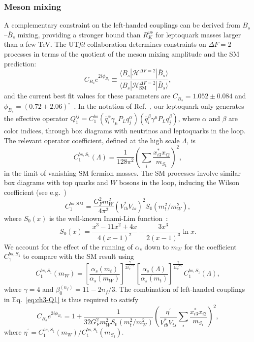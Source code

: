 \subsubsection{Meson mixing}

A complementary constraint on the left-handed couplings can be derived from
$B_s$--$\bar{B}_s$ mixing, providing a stronger bound than $R_K^{\nu\nu}$ for
leptoquark masses larger than a few TeV. The UT\textit{fit} collaboration
determines constraints on $\Delta F = 2$ processes in terms of the quotient of
the meson mixing amplitude and the SM prediction:
\begin{equation}
  C_{B_s} e^{2i \phi_{B_s}} \equiv \frac{\langle B_s | \mathscr{H}^{\Delta F = 2} | \bar{B}_s \rangle}{\langle B_s | \mathscr{H}^{\Delta F = 2}_{\text{SM}} | \bar{B}_s \rangle},
\end{equation}
and the current best fit values for these parameters are $C_{B_s} = 1.052 \pm
0.084$ and $\phi_{B_s} = (0.72 \pm 2.06)^\circ$~\cite{Bona:2007vi}. In the
notation of Ref.~\cite{Bona:2007vi}, our leptoquark only generates the effective
operator $Q^{ij}_1 = C^{bs}_1(\bar{q}^\alpha_i \gamma_\mu P_L
q_j^\alpha)(\bar{q}^\beta_i \gamma^\mu P_L q_j^\beta)$, where $\alpha$ and
$\beta$ are color indices, through box diagrams with neutrinos and leptoquarks
in the loop. The relevant operator coefficient, defined at the high scale
$\Lambda$, is
\begin{equation} \label{eq:ch3-Q1}
  C^{bs, S_{1}}_{1}(\Lambda) = \frac{1}{128 \pi^2} \left(\sum_i \frac{x_{i 3}^* x_{i 2}}{m_{S_{1}}}\right)^2,
\end{equation}
in the limit of vanishing SM fermion masses. The SM processes involve similar
box diagrams with top quarks and $W$ bosons in the loop, inducing the Wilson
coefficient (see e.g.~\cite{Fleischer:2008uj})
\begin{equation}
  C^{bs, \text{SM}}_{1} = \frac{G_F^2 m_W^2}{4\pi^2}(V_{tb}^*V_{ts})^2 S_0(m_t^2 / m_W^2),
\end{equation}
where $S_0(x)$ is the well-known Inami-Lim function~\cite{Inami:1980fz}:
\begin{equation}
  S_0(x) = \frac{x^3 -11x^2 + 4x}{4(x-1)^2} - \frac{3x^3}{2(x-1)^3} \ln x.
\end{equation}
We account for the effect of the running of $\alpha_s$ down to $m_W$ for the
coefficient $C^{bs, S_{1}}_{1}$ to compare with the SM result
using~\cite{Aebischer:2017gaw}
\begin{equation}
  C_1^{bs, S_{1}}(m_W) =  \left[\frac{\alpha_s(m_t)}{\alpha_s(m_W)}\right]^{\frac{\gamma}{2\beta_0^{(5)}}} \left[\frac{\alpha_s(\Lambda)}{\alpha_s(m_t)}\right]^{\frac{\gamma}{2\beta_0^{(6)}}} C_1^{bs, S_{1}}(\Lambda),
\end{equation}
where $\gamma = 4$ and $\beta_0^{(n_f)} = 11 - 2 n _f / 3$. The combination of
left-handed couplings in Eq.~\eqref{eq:ch3-Q1} is thus required to satisfy
\begin{equation} \label{eq:ch3-BsBsbar}
  C_{B_s} e^{2i \phi_{B_s}} = 1 + \frac{1}{32 G_F^2 m_W^2 S_0(m_t^2/m_W^2)} \left(  \frac{\eta^\prime}{V_{tb}^* V_{ts}} \sum_i \frac{x_{i 3}^* x_{i 2}}{m_{S_{1}}} \right)^2,
\end{equation}
where $\eta^\prime = C_1^{bs, S_{1}}(m_W) / C_1^{bs, S_{1}}(m_{S_{1}})$.


